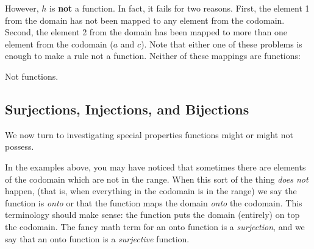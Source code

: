 \documentclass[12pt]{article}
\begin{document}
\begin{example}
\begin{solution}
  However, $h$ is \textbf{not} a function.  In fact, it fails for two reasons.  First, the element 1 from the domain has not been mapped to any element from the codomain.  Second, the element 2 from the domain has been mapped to more than one element from the codomain ($a$ and $c$).  Note that either one of these problems is enough to make a rule not a function.  Neither of these mappings are functions:
  \begin{center}
    \begin{multicols}{2}
       

    \end{multicols}
  Not functions.
  \end{center}

\end{solution}

\end{example}

\subsection{Surjections, Injections, and Bijections}

We now turn to investigating special properties functions might or might not possess.  

In the examples above, you may have noticed that sometimes there are elements of the codomain which are not in the range.  When this sort of the thing \emph{does not} happen, (that is, when everything in the codomain is in the range) we say the function is \emph{onto} or that the function maps the domain \emph{onto} the codomain.  This terminology should make sense: the function puts the domain (entirely) on top the codomain.  The fancy math term for an onto function is a \emph{surjection}, and we say that an onto function is a \emph{surjective} function.
\end{document}
